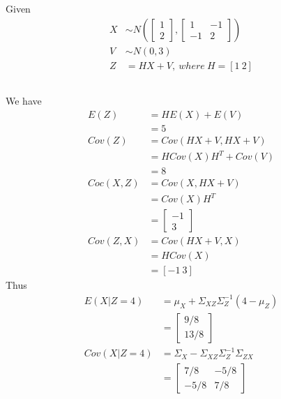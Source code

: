 \documentclass{article}
\begin{document}
\section{}
Given
\begin{align*}
    X&\sim N(
        \begin{bmatrix}
            1\\2
        \end{bmatrix}
        ,
        \begin{bmatrix}
            1&-1\\-1&2
        \end{bmatrix}
    )\\
    V&\sim N(0,3)\\
    Z&=HX+V,\ where\ H=[1\ 2]
\end{align*}
\subsection{}
We have
\begin{align*}
    E(Z)&=HE(X)+E(V)\\
    &=5\\
    Cov(Z)&=Cov(HX+V,HX+V)\\
    &=HCov(X)H^T+Cov(V)\\
    &=8\\
    Coc(X,Z)&=Cov(X,HX+V)\\
    &=Cov(X)H^T\\
    &=\begin{bmatrix}
        -1\\3
    \end{bmatrix}\\
    Cov(Z,X)&=Cov(HX+V,X)\\
    &=HCov(X)\\
    &=[-1\ 3]
\end{align*}
Thus
\begin{align*}
    E(X|Z=4)&=\mu_X+\Sigma_{XZ}\Sigma_Z^{-1}(4-\mu_Z)\\
    &=\begin{bmatrix}
        9/8\\13/8
    \end{bmatrix}\\
    Cov(X|Z=4)&=\Sigma_X-\Sigma_{XZ}\Sigma_Z^{-1}\Sigma_{ZX}\\
    &=\begin{bmatrix}
        7/8&-5/8\\
        -5/8&7/8
    \end{bmatrix}
\end{align*}
\end{document}
